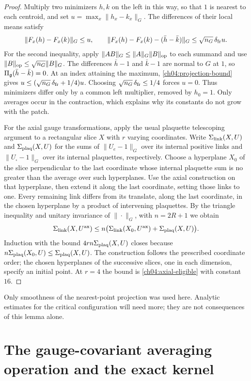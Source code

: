 \begin{proof}
Multiply two minimizers $h,k$ on the left in this way, so that $1$ is nearest to each centroid, and set
$u=\max_x\|h_x-k_x\|_G$. The differences of their local means satisfy
\[
 \|F_x(h)-F_x(k)\|_G\le u,\qquad
 \|F_x(h)-F_x(k)-(\bar h-\bar k)\|_G\le \sqrt{n_G}\,\delta_{\rm fr} u.
\]
For the second inequality, apply $\|AB\|_G\le\|A\|_G\|B\|_{\rm op}$
to each summand and use $\|B\|_{\rm op}\le\sqrt{n_G}\|B\|_G$.
The differences $\bar h-1$ and $\bar k-1$ are normal to $G$ at $1$, so
$\Pi_{\mathfrak g}(\bar h-\bar k)=0$. At an index attaining the maximum,
\eqref{ch04:projection-bound} gives $u\le(\sqrt{n_G}\,\delta_{\rm fr}+1/4)u$.
Choosing $\sqrt{n_G}\,\delta_{\rm fr}\le1/4$
forces $u=0$. Thus minimizers differ only by a common left multiplier,
removed by $h_0=1$. Only averages occur in the contraction, which explains
why its constants do not grow with the patch.

For the axial gauge transformations, apply the usual plaquette telescoping
argument to a rectangular slice $X$ with $r$ varying coordinates. Write
$\Sigma_{\rm link}(X,U)$ and $\Sigma_{\rm plaq}(X,U)$ for the sums of
$\|U_e-1\|_G$ over its internal positive links and
$\|U_\square-1\|_G$ over its internal plaquettes, respectively. Choose a
hyperplane $X_0$ of the slice perpendicular to the last coordinate whose internal plaquette sum
is no greater than the average over such hyperplanes. Use the axial construction on
that hyperplane, then extend it along the last coordinate, setting those links
to one. Every remaining link differs from its translate, along the last coordinate, in the
chosen hyperplane by a product of intervening plaquettes. By the triangle
inequality and unitary invariance of $\|\cdot\|_G$, with $n=2R+1$ we obtain
\[
 \Sigma_{\rm link}(X,U^{\rm ax})
 \le n\bigl(\Sigma_{\rm link}(X_0,U^{\rm ax})+
                            \Sigma_{\rm plaq}(X,U)\bigr).
\]
Induction with the bound $4rn\Sigma_{\rm plaq}(X,U)$ closes because
$n\Sigma_{\rm plaq}(X_0,U)\le\Sigma_{\rm plaq}(X,U)$.
The construction follows the prescribed coordinate order; the chosen
hyperplanes of the successive slices, one in each dimension, specify an initial point. At $r=4$ the bound is \eqref{ch04:axial-eligible}
with constant $16$.
\end{proof}

Only smoothness of the nearest-point projection was used here. Analytic
estimates for the critical configuration will need more; they are not consequences of
this lemma alone.

\section{The gauge-covariant averaging operation and the exact kernel}
\label{ch04:kernel-section}


